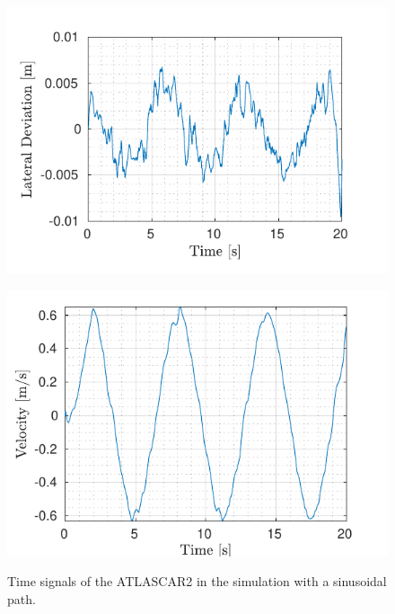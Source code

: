 \begin{figure}[!h]
\begin{minipage}[t]{0.49\textwidth}
		\includegraphics[width=\textwidth]{../../MATLAB/lane_following/figure/LateralDeviationVsTime.pdf}
		\label{fig:lateral_deviation_laneFollowing}
	\end{minipage}
	\begin{minipage}[t]{0.49\textwidth}
		\includegraphics[width=\textwidth]{../../MATLAB/lane_following/figure/LateralVelocityVsTime.pdf}
		\label{fig:lateral_velocity_laneFollowing}
	\end{minipage}
	\caption{Time signals of the ATLASCAR2 in the simulation with a sinusoidal path.}
	\label{fig:laneFollowing_signals}
\end{figure}

